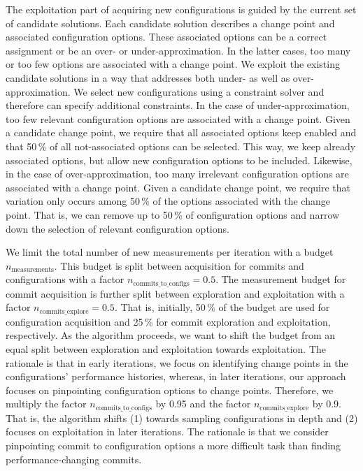 \documentclass[sigconf]{acmart}
\begin{document}
	The exploitation part of acquiring new configurations is guided by the current set of candidate solutions. Each candidate solution describes a change point and associated configuration options. These associated options can be a correct assignment or be an over- or under-approximation. In the latter cases, too many or too few options are associated with a change point. We exploit the existing candidate solutions in a way that addresses both under- as well as over-approximation. We select new configurations using a constraint solver and therefore can specify additional constraints. 
	In the case of under-approximation, too few relevant configuration options are associated with a change point. Given a candidate change point, we require that all associated options keep enabled and that 50\,\% of all not-associated options can be selected. This way, we keep already associated options, but allow new configuration options to be included. Likewise, in the case of over-approximation, too many irrelevant configuration options are associated with a change point. Given a candidate change point, we require that variation only occurs among 50\,\% of the options associated with the change point. That is, we can remove up to 50\,\% of configuration options and narrow down the selection of relevant configuration options.
	
	We limit the total number of new measurements per iteration with a budget $n_\text{measurements}$. This budget is split between acquisition for commits and configurations with a factor $n_\text{commits\_to\_configs} = 0.5$. The measurement budget for commit acquisition is further split between exploration and exploitation with a factor $n_\text{commits\_explore} = 0.5$. That is, initially, 50\,\% of the budget are used for configuration acquisition and 25\,\% for commit exploration and exploitation, respectively. 
	As the algorithm proceeds, we want to shift the budget from an equal split between exploration and exploitation towards exploitation. The rationale is that in early iterations, we focus on identifying change points in the configurations' performance histories, whereas, in later iterations, our approach focuses on pinpointing configuration options to change points. Therefore, we multiply the factor $n_\text{commits\_to\_configs}$ by 0.95 and the factor $n_\text{commits\_explore}$ by 0.9. That is, the algorithm shifts  (1) towards sampling configurations in depth and (2) focuses on exploitation in later iterations. The rationale is that we consider pinpointing commit to configuration options a more difficult task than finding performance-changing commits.
	
\end{document}

